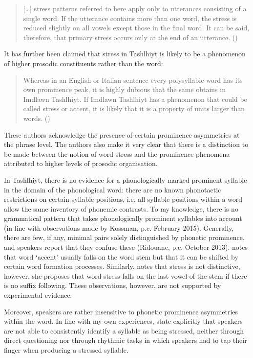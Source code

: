 \begin{quote}
[…] stress patterns referred to here apply only to utterances consisting of a single word. If the utterance contains more than one word, the stress is reduced slightly on all vowels except those in the final word. It can be said, therefore, that primary stress occurs only at the end of an utterance. (\citealt[9]{Applegate1958})
\end{quote}

It has further been claimed that stress in Tashlhiyt is likely to be a phenomenon of higher prosodic constituents rather than the word:

\begin{quote}
Whereas in an English or Italian sentence every polysyllabic word has its own prominence peak, it is highly dubious that the same obtains in Imdlawn Tashlhiyt. If Imdlawn Tashlhiyt has a phenomenon that could be called stress or accent, it is likely that it is a property of units larger than words. (\citealt[14]{DE2002})
\end{quote}

These authors acknowledge the presence of certain prominence asymmetries at the phrase level. The authors also make it very clear that there is a distinction to be made between the notion of word stress and the prominence phenomena attributed to higher levels of prosodic organisation.

In Tashlhiyt, there is no evidence for a phonologically marked prominent syllable in the domain of the phonological word: there are no known phonotactic restrictions on certain syllable positions, i.e. all syllable positions within a word allow the same inventory of phonemic contrasts. To my knowledge, there is no grammatical pattern that takes phonologically prominent syllables into account (in line with observations made by Kossman, p.c. February 2015). Generally, there are few, if any, minimal pairs solely distinguished by phonetic prominence, and speakers report that they confuse these (Ridouane, p.c. October 2013). \citet{Stumme1899} notes that word ‘accent’ usually falls on the word stem but that it can be shifted by certain word formation processes. Similarly, \citet{Sadiqi1997} notes that stress is not distinctive, however, she proposes that word stress falls on the last vowel of the stem if there is no suffix following. These  observations, however, are not supported by experimental evidence.

Moreover, speakers are rather insensitive to phonetic prominence asymmetries within the word. In line with my own experiences, \citet[708]{GordonNafi2012} state explicitly that speakers are not able to consistently identify a syllable as being stressed, neither through direct questioning nor through rhythmic tasks in which speakers had to tap their finger when producing a stressed syllable.

